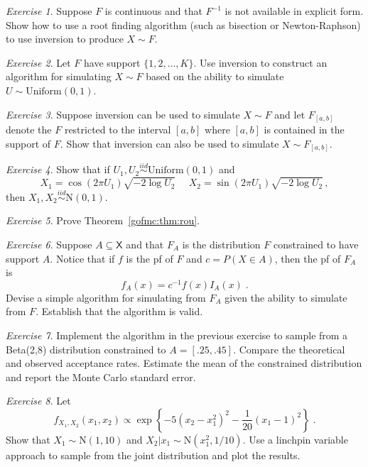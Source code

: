 \documentclass[12pt]{article}
\theoremstyle{plain}
\theoremstyle{definition}
\theoremstyle{remark}
\newtheorem{hw}{Exercise}[section]
\newcommand{\sX}{\mathsf{X}}
\begin{document}
\begin{hw}
Suppose $F$ is continuous and that  $F^{-1}$ is not available in
explicit form. Show how to use a root finding algorithm (such as
bisection or Newton-Raphson) to use inversion to produce $X \sim F$. 
\end{hw}

\begin{hw}
Let $F$ have support $\{1,2,\ldots,K\}$.  Use inversion to construct
an algorithm for simulating $X \sim F$ based on the ability to
simulate $U \sim \text{Uniform}(0,1)$. 
\end{hw}

\begin{hw}
  Suppose inversion can be used to simulate $X \sim F$ and let
  $F_{[a,b]}$ denote the $F$ restricted to the interval $[a,b]$ where
  $[a,b]$ is contained in the support of $F$.  Show that inversion can
  also be used to simulate $X \sim F_{[a,b]}$.
\end{hw}

\begin{hw}
Show that if $U_1 , U_2 \stackrel{iid}{\sim}
  \text{Uniform}(0,1)$ and
\[
X_1 = \cos(2\pi U_1) \sqrt{-2 \log U_2} ~~~~~~ X_2 = \sin(2\pi U_1)
\sqrt{-2 \log U_2}\, ,
\]
then $X_1, X_2 \stackrel{iid}{\sim}\text{N}(0,1)$.
\end{hw}

\begin{hw}
Prove Theorem~\ref{gofmc:thm:rou}.
\end{hw}

\begin{hw}
Suppose $A \subseteq \sX$ and that $F_{A}$ is the distribution $F$
constrained to have support $A$.  Notice that if $f$ is the pf of $F$
and $c= P(X \in A)$, then the pf of $F_{A}$ is
\[
f_{A}(x) = c^{-1} f(x) I_{A}(x) \; .
\]
Devise a simple algorithm for simulating from $F_A$ given the ability
to simulate from $F$.  Establish that the algorithm is valid.  
\end{hw}

\begin{hw}
Implement the algorithm in the previous exercise to sample from a
Beta(2,8) distribution constrained to $A=[.25,.45]$.  Compare the
theoretical and observed acceptance rates. Estimate the mean of the
constrained distribution and report the Monte Carlo standard error. 
\end{hw}

\begin{hw}
Let
$$
f_{X_1, X_2}(x_1, x_2) \propto \exp \left\{ -5(x_2 - x_{1}^{2})^{2} -
  \frac{1}{20} (x_1 - 1)^{2} \right\} \; . 
$$
Show that $X_1 \sim \text{N}(1,10)$ and $X_{2}|x_1 \sim
\text{N}(x_{1}^2, 1/10)$. Use a linchpin variable approach to sample
from the joint distribution and plot the results.   
\end{hw}
\end{document}
